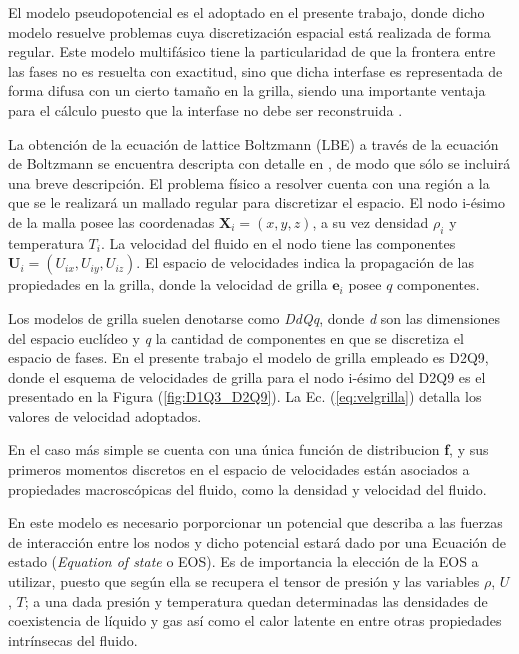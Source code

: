 El modelo pseudopotencial es el adoptado en el presente trabajo, donde dicho modelo resuelve problemas cuya discretización espacial está realizada de forma regular. Este modelo multifásico tiene la particularidad de que la frontera entre las fases no es resuelta con exactitud, sino que dicha interfase es representada de forma difusa con un cierto tamaño en la grilla, siendo una importante ventaja para el cálculo puesto que la interfase no debe ser reconstruida \cite{parrill2019reviews}.


La obtención de la ecuación de lattice Boltzmann (LBE) a través de la ecuación de Boltzmann se encuentra descripta con detalle en \cite{kruger2017lattice}, de modo que sólo se incluirá una breve descripción. El problema físico a resolver cuenta con una región a la que se le realizará un mallado regular para discretizar el espacio. El nodo i-ésimo de la malla posee las coordenadas $\mathbf{X}_{i} = (x,y,z)$, a su vez densidad $\rho_{i}$ y temperatura $T_{i}$. La velocidad del fluido en el nodo tiene las componentes $\mathbf{U}_{i} = ({U}_{ix},{U}_{iy},{U}_{iz})$. El espacio de velocidades indica la propagación de las propiedades en la grilla, donde la velocidad de grilla $\mathbf{e}_{i}$ posee $q$ componentes.

Los modelos de grilla suelen denotarse como \textit{DdQq}, donde \textit{d} son las dimensiones del espacio euclídeo y \textit{q} la cantidad de componentes en que se discretiza el espacio de fases. En el presente trabajo el modelo de grilla empleado es D2Q9, donde el esquema de velocidades de grilla para el nodo i-ésimo del D2Q9 es el presentado en la Figura (\ref{fig:D1Q3_D2Q9}). La Ec. (\ref{eq:velgrilla}) detalla los valores de velocidad adoptados. 

En el caso más simple se cuenta con una única función de distribucion \textbf{f}, y sus primeros momentos discretos en el espacio de velocidades están asociados a propiedades macroscópicas del fluido, como la densidad y velocidad del fluido.

En este modelo es necesario porporcionar un potencial que describa a las fuerzas de interacción entre los nodos y dicho potencial estará dado por una Ecuación de estado (\textit{Equation of state} o EOS). Es de importancia la elección de la EOS a utilizar, puesto que según ella se recupera el tensor de presión y las variables $\rho$, $U$, $T$; a una dada presión y temperatura quedan determinadas las densidades de coexistencia de líquido y gas así como el calor latente en entre otras propiedades intrínsecas del fluido.

